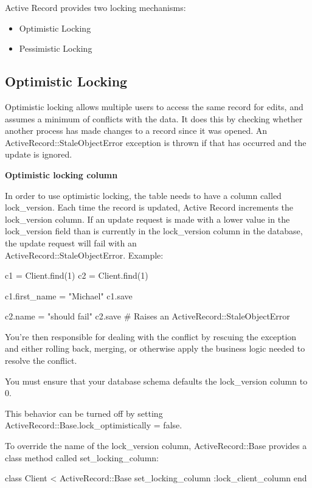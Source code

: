 \documentclass[10pt]{book}
\newenvironment{code}{%
  \scriptsize
    \verbatim
}{%
    \endverbatim
    \newline
}
\begin{document}
Active Record provides two locking mechanisms:
\begin{itemize}
	\item Optimistic Locking
	\item Pessimistic Locking
\end{itemize}

\subsection{ Optimistic Locking}

Optimistic locking allows multiple users to access the same record  for edits, and assumes a minimum of conflicts with the data. It does  this by checking whether another process has made changes to a record  since it was opened. An ActiveRecord::StaleObjectError exception is thrown if that has occurred and the update is ignored.

\textbf{Optimistic locking column}

In order to use optimistic locking, the table needs to have a column called lock\_version. Each time the record is updated, Active Record increments the lock\_version column. If an update request is made with a lower value in the lock\_version field than is currently in the lock\_version column in the database, the update request will fail with an \\ ActiveRecord::StaleObjectError. Example:
\begin{code}
c1 = Client.find(1)
c2 = Client.find(1)
 
c1.first_name = "Michael"
c1.save
 
c2.name = "should fail"
c2.save # Raises an ActiveRecord::StaleObjectError
\end{code}

You’re then responsible for dealing with the conflict by rescuing the  exception and either rolling back, merging, or otherwise apply the  business logic needed to resolve the conflict.

You must ensure that your database schema defaults the lock\_version column to 0.

This behavior can be turned off by setting \\ ActiveRecord::Base.lock\_optimistically = false.

To override the name of the lock\_version column, ActiveRecord::Base provides a class method called set\_locking\_column:
\begin{code}
class Client < ActiveRecord::Base
  set_locking_column :lock_client_column
end
\end{code}
\end{document}
